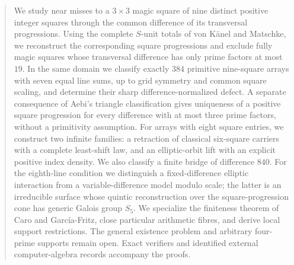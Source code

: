 \begin{abstract}
We study near misses to a $3\times3$ magic square of nine distinct positive
integer squares through the common difference of its transversal
progressions. Using the complete $S$-unit totals of von K\"anel and
Matschke, we reconstruct the corresponding square progressions and exclude
fully magic squares whose transversal difference has only prime factors
at most $19$. In the same domain we classify exactly $384$ primitive
nine-square arrays with seven equal line sums, up to grid symmetry and
common square scaling, and determine their sharp difference-normalized
defect. A separate consequence of Aebi's triangle classification gives
uniqueness of a positive square progression for every difference with at
most three prime factors, without a primitivity assumption.
For arrays with eight square entries, we construct two infinite families:
a retraction of classical six-square carriers with a complete least-shift
law, and an elliptic-orbit lift with an explicit positive index density.
We also classify a finite bridge of difference $840$.
For the eighth-line condition we distinguish a fixed-difference elliptic
interaction from a variable-difference model modulo scale; the latter is
an irreducible surface whose quintic reconstruction over the
square-progression cone has generic Galois group $S_5$. We specialize the finiteness
theorem of Caro and Garc\'ia-Fritz, close particular arithmetic fibres,
and derive local support restrictions. The general existence problem and
arbitrary four-prime supports remain open. Exact verifiers and identified
external computer-algebra records accompany the proofs.
\end{abstract}
